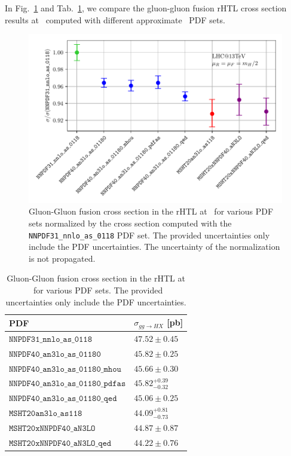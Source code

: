 In Fig.~\ref{fig:4:pdf_benchmark} and Tab.~\ref{tab:4:pdf_benchmark}, we compare the gluon-gluon fusion \acs{rHTL} cross section results at \NNNLO\ computed with different approximate \NNNLO\ \acs{PDF} sets.
\begin{figure}[h]
  \centering
  \includegraphics[width=\figurewidth]{Images/pdf_benchmark.pdf}
  \caption{Gluon-Gluon fusion cross section in the \acs{rHTL} at \NNNLO\ for various \acs{PDF} sets normalized by the cross section computed with the \texttt{NNPDF31\_nnlo\_as\_0118} \acs{PDF} set. The provided uncertainties only include the \acs{PDF} uncertainties. The uncertainty of the normalization is not propagated.}
  \label{fig:4:pdf_benchmark}
\end{figure}
\begin{table}[h]
  \centering
  \caption{Gluon-Gluon fusion cross section in the \acs{rHTL} at \NNNLO\ for various \acs{PDF} sets. The provided uncertainties only include the \acs{PDF} uncertainties.}
  \label{tab:4:pdf_benchmark}
  \begin{tabular}{l l}
    \hline
    \acs{PDF} & $\sigma_{gg \rightarrow HX}$ [pb] \\
    \hline
    $\mathtt{NNPDF31\_nnlo\_as\_0118}$ & $47.52 \pm 0.45$ \\
    $\mathtt{NNPDF40\_an3lo\_as\_01180}$ & $45.82 \pm 0.25$ \\
    $\mathtt{NNPDF40\_an3lo\_as\_01180\_mhou}$ & $45.66 \pm 0.30$ \\
    $\mathtt{NNPDF40\_an3lo\_as\_01180\_pdfas}$ & $45.82 ^{{+0.39}}_{{-0.32}}$ \\
    $\mathtt{NNPDF40\_an3lo\_as\_01180\_qed}$ & $45.06 \pm 0.25$ \\
    $\mathtt{MSHT20an3lo\_as118}$ & $44.09 ^{{+0.81}}_{{-0.73}}$ \\
    $\mathtt{MSHT20xNNPDF40\_aN3LO}$ & $44.87 \pm 0.87$ \\
    $\mathtt{MSHT20xNNPDF40\_aN3LO\_qed}$ & $44.22 \pm 0.76$ \\
    \hline
  \end{tabular}
\end{table}
